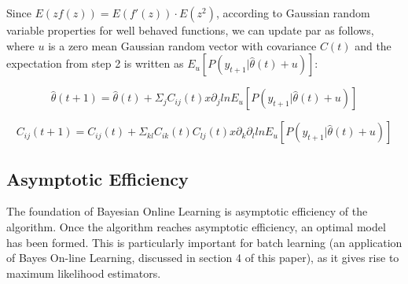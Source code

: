 																																																																																																																									    \noindent Since $E(zf(z)) = E(f'(z)) \cdot E(z^2)$, according to Gaussian random variable properties for well behaved functions, we can update par as follows, where $u$ is a zero mean Gaussian random vector with covariance $C(t)$ and the expectation from step 2 is written as $E_u[P(y_{t+1} | \hat\theta(t) +u)]$:
																																																																																																																										    
																																																																																																																											    $$\hat\theta(t+1) = \hat\theta(t) + \Sigma_j C_{ij}(t) x \partial_j ln E_u [P(y_{t+1} | \hat\theta(t) + u)]$$
																																																																																																																												    
																																																																																																																													    $$C_{ij}(t+1) = C_{ij}(t) + \Sigma_{kl} C_{ik}(t)C_{lj}(t) x \partial_k \partial_l ln E_u[P(y_{t+1} | \hat\theta(t) + u)] $$
																																																																																																																														    
																																																																																																																															        
																																																																																																																																	\subsection{Asymptotic Efficiency}

																																																																																																																																	    The foundation of Bayesian Online Learning is asymptotic efficiency of the algorithm. Once the algorithm reaches asymptotic efficiency, an optimal model has been formed. This is particularly important for batch learning (an application of Bayes On-line Learning, discussed in section 4 of this paper), as it gives rise to maximum likelihood estimators.\vspace{4mm}
																																																																																																																																		    
